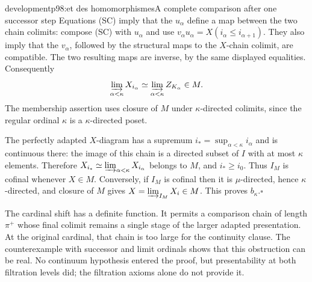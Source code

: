 \begin{dcomment}{development}{p98:et des homomorphismes}{A complete comparison after one successor step}
Equations (SC) imply that the $u_\alpha$ define a map between the two chain colimits: compose (SC) with $u_\alpha$ and use $v_\alpha u_\alpha=X(i_\alpha\leq i_{\alpha+1})$. They also imply that the $v_\alpha$, followed by the structural maps to the $X$-chain colimit, are compatible. The two resulting maps are inverse, by the same displayed equalities. Consequently
\[
 \varinjlim_{\alpha<\kappa}X_{i_\alpha}
 \simeq\varinjlim_{\alpha<\kappa}Z_{K_\alpha}\in M.
\]
The membership assertion uses closure of $M$ under $\kappa$-directed colimits, since the regular ordinal $\kappa$ is a $\kappa$-directed poset.

The perfectly adapted $X$-diagram has a supremum $i_* =\sup_{\alpha<\kappa}i_\alpha$ and is continuous there: the image of this chain is a directed subset of $I$ with at most $\kappa$ elements. Therefore $X_{i_*}\simeq\varinjlim_{\alpha<\kappa}X_{i_\alpha}$ belongs to $M$, and $i_*\geq i_0$. Thus $I_M$ is cofinal whenever $X\in M$. Conversely, if $I_M$ is cofinal then it is $\mu$-directed, hence $\kappa$-directed, and closure of $M$ gives $X=\varinjlim_{I_M}X_i\in M$. This proves $b_\kappa$.\hfill$\square$

The cardinal shift has a definite function. It permits a comparison chain of length $\pi^+$ whose final colimit remains a single stage of the larger adapted presentation. At the original cardinal, that chain is too large for the continuity clause. The counterexample with successor and limit ordinals shows that this obstruction can be real. No continuum hypothesis entered the proof, but presentability at both filtration levels did; the filtration axioms alone do not provide it.
\end{dcomment}


